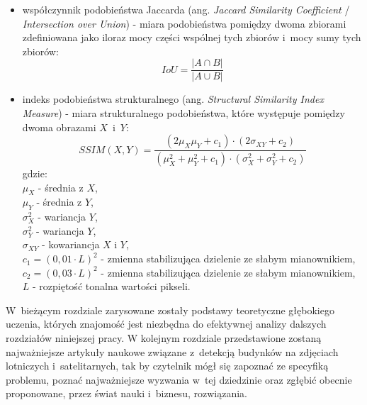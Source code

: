 \begin{itemize}
\begin{equation}
\end{equation}
\item współczynnik podobieństwa Jaccarda (ang. \emph{Jaccard Similarity Coefficient} / \emph{Intersection over Union}) - miara podobieństwa pomiędzy dwoma zbiorami zdefiniowana jako iloraz mocy części wspólnej tych zbiorów i~mocy sumy tych zbiorów:
\begin{equation}
IoU = \frac{|A \cap B |}{|A \cup B|}
\end{equation}
\item indeks podobieństwa strukturalnego (ang. \emph{Structural Similarity Index Measure}) - miara strukturalnego podobieństwa, które występuje pomiędzy dwoma obrazami $X$~i~$Y$:
\begin{equation}
SSIM(X, Y) = \frac{(2 \mu_X  \mu_Y + c_1) \cdot (2  \sigma_{XY} + c_2)}{(\mu^{2}_{X} + \mu^{2}_{Y} + c_1) \cdot (\sigma^{2}_{X} + \sigma^{2}_{Y} + c_2)}
\end{equation}
gdzie: \\
\hspace*{2em}$\mu_X$ - średnia z $X$, \\
\hspace*{2em}$\mu_Y$ - średnia z $Y$,\\
\hspace*{2em}$\sigma^{2}_{X}$ - wariancja $Y$,\\
\hspace*{2em}$\sigma^{2}_{Y}$ - wariancja $Y$,\\
\hspace*{2em}$\sigma_{XY}$ - kowariancja $X$ i $Y$,\\
\hspace*{2em}$c_1 = (0,01 \cdot L)^2$ - zmienna stabilizująca dzielenie ze słabym mianownikiem,\\
\hspace*{2em}$c_2 = (0,03 \cdot L)^2$ - zmienna stabilizująca dzielenie ze słabym mianownikiem,\\
\hspace*{2em}$L$ - rozpiętość tonalna wartości pikseli.\\
\end{itemize}

W~bieżącym rozdziale zarysowane zostały podstawy teoretyczne głębokiego uczenia, których znajomość jest niezbędna do efektywnej analizy dalszych rozdziałów niniejszej pracy. W kolejnym rozdziale przedstawione zostaną najważniejsze artykuły naukowe związane z~detekcją budynków na zdjęciach lotniczych i~satelitarnych, tak by czytelnik mógł się zapoznać ze specyfiką problemu, poznać najważniejsze wyzwania w~tej dziedzinie oraz zgłębić obecnie proponowane, przez świat nauki i~biznesu, rozwiązania.